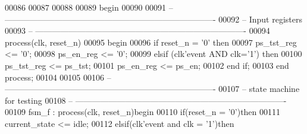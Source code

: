 \begin{DoxyCode}
00086 
00087 
00088   
00089 \textcolor{vhdlkeyword}{begin}
00090 
00091 \textcolor{keyword}{-- ----------------------------------------------------------------------------}
00092 \textcolor{keyword}{-- Input registers}
00093 \textcolor{keyword}{-- ----------------------------------------------------------------------------}
00094    \textcolor{keywordflow}{process}(clk, reset_n)
00095 \textcolor{vhdlkeyword}{   begin}
00096       \textcolor{keywordflow}{if} \textcolor{vhdlchar}{reset_n} \textcolor{vhdlchar}{=} \textcolor{vhdlchar}{'}\textcolor{vhdllogic}{}\textcolor{vhdllogic}{0}\textcolor{vhdlchar}{'} \textcolor{keywordflow}{then} 
00097          \textcolor{vhdlchar}{ps_tst_reg}  \textcolor{vhdlchar}{<=} \textcolor{vhdlchar}{'}\textcolor{vhdllogic}{}\textcolor{vhdllogic}{0}\textcolor{vhdlchar}{'};
00098          \textcolor{vhdlchar}{ps_en_reg}   \textcolor{vhdlchar}{<=} \textcolor{vhdlchar}{'}\textcolor{vhdllogic}{}\textcolor{vhdllogic}{0}\textcolor{vhdlchar}{'};
00099       \textcolor{keywordflow}{elsif} \textcolor{vhdlchar}{(}\textcolor{vhdlchar}{clk}\textcolor{vhdlchar}{'}\textcolor{vhdlkeyword}{event} \textcolor{keywordflow}{AND} \textcolor{vhdlchar}{clk}\textcolor{vhdlchar}{=}\textcolor{vhdlchar}{'}\textcolor{vhdllogic}{}\textcolor{vhdllogic}{1}\textcolor{vhdlchar}{'}\textcolor{vhdlchar}{)} \textcolor{keywordflow}{then} 
00100          \textcolor{vhdlchar}{ps_tst_reg}  \textcolor{vhdlchar}{<=} \textcolor{vhdlchar}{ps_tst};
00101          \textcolor{vhdlchar}{ps_en_reg}   \textcolor{vhdlchar}{<=} \textcolor{vhdlchar}{ps_en};
00102       \textcolor{keywordflow}{end} \textcolor{keywordflow}{if};
00103    \textcolor{keywordflow}{end} \textcolor{keywordflow}{process};
00104    
00105    
00106 \textcolor{keyword}{-- ----------------------------------------------------------------------------}
00107 \textcolor{keyword}{-- state machine for testing}
00108 \textcolor{keyword}{-- ----------------------------------------------------------------------------}
00109 fsm\_f : \textcolor{keywordflow}{process}(clk, reset_n)\textcolor{keywordflow}{begin}
00110    \textcolor{keywordflow}{if}\textcolor{vhdlchar}{(}\textcolor{vhdlchar}{reset_n} \textcolor{vhdlchar}{=} \textcolor{vhdlchar}{'}\textcolor{vhdllogic}{}\textcolor{vhdllogic}{0}\textcolor{vhdlchar}{'}\textcolor{vhdlchar}{)}\textcolor{keywordflow}{then}
00111       \textcolor{vhdlchar}{current_state}  \textcolor{vhdlchar}{<=} \textcolor{vhdlchar}{idle};
00112    \textcolor{keywordflow}{elsif}\textcolor{vhdlchar}{(}\textcolor{vhdlchar}{clk}\textcolor{vhdlchar}{'}\textcolor{vhdlkeyword}{event} \textcolor{keywordflow}{and} \textcolor{vhdlchar}{clk} \textcolor{vhdlchar}{=} \textcolor{vhdlchar}{'}\textcolor{vhdllogic}{}\textcolor{vhdllogic}{1}\textcolor{vhdlchar}{'}\textcolor{vhdlchar}{)}\textcolor{keywordflow}{then} 

\end{DoxyCode}
